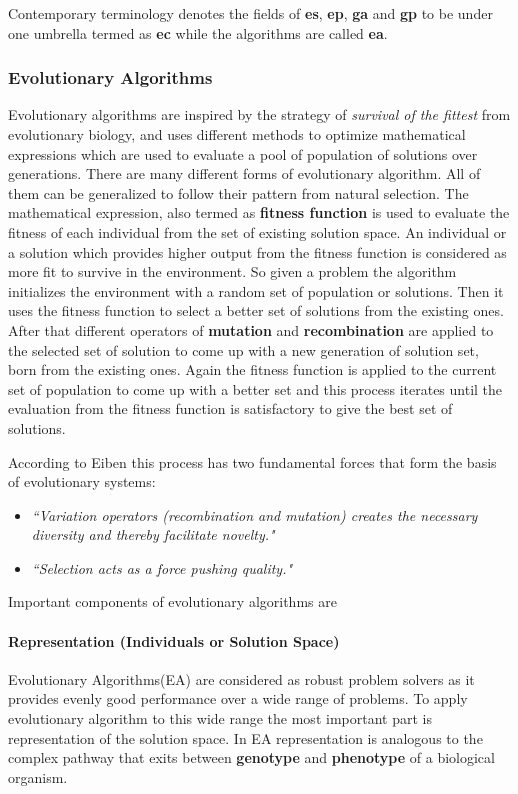 \documentclass[letterpaper]{article}
\numberwithin{equation}{section}
\begin{document}
Contemporary terminology denotes the fields of \textbf{\gls{es}}, \textbf{\gls{ep}}, \textbf{\gls{ga}} and \textbf{\gls{gp}} to be under one umbrella termed as \textbf{\gls{ec}} while the algorithms are called \textbf{\gls{ea}}.

\subsubsection{Evolutionary Algorithms}
Evolutionary algorithms are inspired by the strategy of \textit{survival of the fittest} from evolutionary biology, and uses different methods to optimize mathematical expressions which are used to evaluate a pool of population of solutions over generations. There are many different forms of evolutionary algorithm. All of them can be generalized to follow their pattern from natural selection. The mathematical expression, also termed as \textbf{fitness function} is used to evaluate the fitness of each individual from the set of existing solution space. An individual or a solution which provides higher output from the fitness function is considered as more fit to survive in the environment. So given a problem the algorithm initializes the environment with a random set of population or solutions. Then it uses the fitness function to select a better set of solutions from the existing ones. After that different operators of \textbf{mutation} and \textbf{recombination} are applied to the selected set of solution to come up with a new generation of solution set, born from the existing ones. Again the fitness function is applied to the current set of population to come up with a better set and this process iterates until the evaluation from the fitness function is satisfactory to give the best set of solutions.

According to Eiben \cite{eiben2003} this process has two fundamental forces that form the basis of evolutionary systems:

\begin{itemize}
	\item \textsl{``Variation operators (recombination and mutation) creates the necessary diversity and thereby facilitate novelty."}
	\item \textsl{``Selection acts as a force pushing quality."}
\end{itemize}

Important components of evolutionary algorithms are

\paragraph{Representation (Individuals or Solution Space)}
Evolutionary Algorithms(EA) are considered as robust problem solvers as it provides evenly good performance over a wide range of problems. To apply evolutionary algorithm to this wide range the most important part is representation of the solution space. In EA representation is analogous to the complex pathway that exits between \textbf{genotype} and \textbf{phenotype} of a biological organism.
\end{document}
